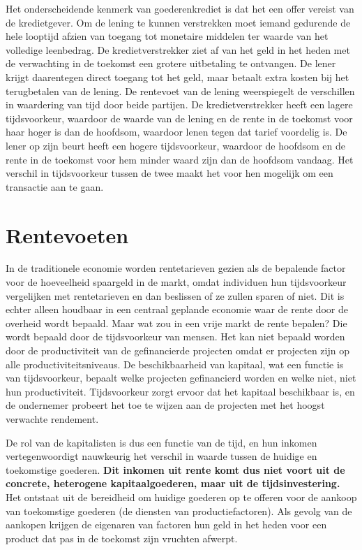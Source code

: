 Het onderscheidende kenmerk van goederenkrediet is dat het een offer vereist van de kredietgever. Om de lening te kunnen verstrekken moet iemand gedurende de hele looptijd afzien van toegang tot monetaire middelen ter waarde van het volledige leenbedrag. De kredietverstrekker ziet af van het geld in het heden met de verwachting in de toekomst een grotere uitbetaling te ontvangen. De lener krijgt daarentegen direct toegang tot het geld, maar betaalt extra kosten bij het terugbetalen van de lening. De rentevoet van de lening weerspiegelt de verschillen in waardering van tijd door beide partijen. De kredietverstrekker heeft een lagere tijdsvoorkeur, waardoor de waarde van de lening en de rente in de toekomst voor haar hoger is dan de hoofdsom, waardoor lenen tegen dat tarief voordelig is. De lener op zijn beurt heeft een hogere tijdsvoorkeur, waardoor de hoofdsom en de rente in de toekomst voor hem minder waard zijn dan de hoofdsom vandaag. Het verschil in tijdsvoorkeur tussen de twee maakt het voor hen mogelijk om een transactie aan te gaan.

\hypertarget{rentevoeten}{%
\section{Rentevoeten}\label{rentevoeten}}

In de traditionele economie worden rentetarieven gezien als de bepalende factor voor de hoeveelheid spaargeld in de markt, omdat individuen hun tijdsvoorkeur vergelijken met rentetarieven en dan beslissen of ze zullen sparen of niet. Dit is echter alleen houdbaar in een centraal geplande economie waar de rente door de overheid wordt bepaald. Maar wat zou in een vrije markt de rente bepalen? Die wordt bepaald door de tijdsvoorkeur van mensen. Het kan niet bepaald worden door de productiviteit van de gefinancierde projecten omdat er projecten zijn op alle productiviteitsniveaus. De beschikbaarheid van kapitaal, wat een functie is van tijdsvoorkeur, bepaalt welke projecten gefinancierd worden en welke niet, niet hun productiviteit. Tijdsvoorkeur zorgt ervoor dat het kapitaal beschikbaar is, en de ondernemer probeert het toe te wijzen aan de projecten met het hoogst verwachte rendement.

\begin{blockquotebox}
De rol van de kapitalisten is dus een functie van de tijd, en hun inkomen vertegenwoordigt nauwkeurig het verschil in waarde tussen de huidige en toekomstige goederen. \textbf{Dit inkomen uit rente komt dus niet voort uit de concrete, heterogene kapitaalgoederen, maar uit de tijdsinvestering.} Het ontstaat uit de bereidheid om huidige goederen op te offeren voor de aankoop van toekomstige goederen (de diensten van productiefactoren). Als gevolg van de aankopen krijgen de eigenaren van factoren hun geld in het heden voor een product dat pas in de toekomst zijn vruchten afwerpt.\footnotemark
\end{blockquotebox}
\autocite{158}

